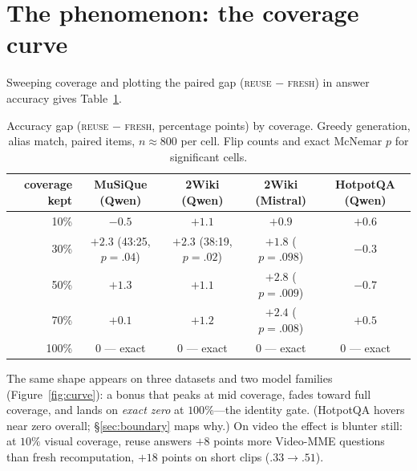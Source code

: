 \documentclass{article} %
\newcommand{\fresh}{\textsc{fresh}}
\newcommand{\reuse}{\textsc{reuse}}
\begin{document}
\section{The phenomenon: the coverage curve}
\label{sec:curve}

Sweeping coverage and plotting the paired gap (\reuse{} $-$ \fresh{}) in answer accuracy gives Table~\ref{tab:curve}.

\begin{table}[t]
\centering
\caption{Accuracy gap (\reuse{} $-$ \fresh{}, percentage points) by coverage. Greedy generation, alias match, paired items, $n\approx800$ per cell. Flip counts and exact McNemar $p$ for significant cells.}
\label{tab:curve}
\small
\setlength{\tabcolsep}{4.5pt}
\begin{tabular}{rcccc}
\toprule
coverage kept & MuSiQue (Qwen) & 2Wiki (Qwen) & 2Wiki (Mistral) & HotpotQA (Qwen) \\
\midrule
10\% & $-0.5$ & $+1.1$ & $+0.9$ & $+0.6$ \\
30\% & $\mathbf{+2.3}$ {\scriptsize(43:25, $p{=}.04$)} & $\mathbf{+2.3}$ {\scriptsize(38:19, $p{=}.02$)} & $+1.8$ {\scriptsize($p{=}.098$)} & $-0.3$ \\
50\% & $+1.3$ & $+1.1$ & $\mathbf{+2.8}$ {\scriptsize($p{=}.009$)} & $-0.7$ \\
70\% & $+0.1$ & $+1.2$ & $\mathbf{+2.4}$ {\scriptsize($p{=}.008$)} & $+0.5$ \\
100\% & 0 --- exact & 0 --- exact & 0 --- exact & 0 --- exact \\
\bottomrule
\end{tabular}
\end{table}

The same shape appears on three datasets and two model families (Figure~\ref{fig:curve}): a bonus that peaks at mid coverage, fades toward full coverage, and lands on \emph{exact zero} at $100\%$---the identity gate. (HotpotQA hovers near zero overall; \S\ref{sec:boundary} maps why.) On video the effect is blunter still: at $10\%$ visual coverage, reuse answers $+8$ points more Video-MME questions than fresh recomputation, $+18$ points on short clips ($.33\rightarrow.51$).
\end{document}
